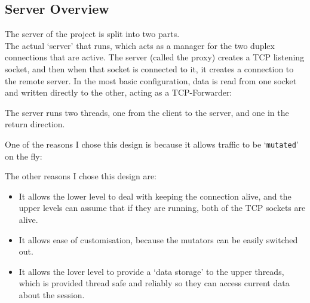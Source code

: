 \subsection{Server Overview}
The server of the project is split into two parts.\\
The actual `server' that runs, which acts as a manager for the two duplex connections that are active. The server (called the proxy) creates a TCP listening socket, and then when that socket is connected to it, it creates a connection to the remote server.
In the most basic configuration, data is read from one socket and written directly to the other, acting as a TCP-Forwarder:
\begin{center}
\end{center}

The server runs two threads, one from the client to the server, and one in the return direction.\par
One of the reasons I chose this design is because it allows traffic to be `\texttt{mutated}' on the fly:
\begin{center}
\end{center}
The other reasons I chose this design are:
\begin{itemize}
    \item It allows the lower level to deal with keeping the connection alive, and the upper levels can assume that if they are running, both of the TCP sockets are alive.
    \item It allows ease of customisation, because the mutators can be easily switched out.
    \item It allows the lover level to provide a `data storage' to the upper threads, which is provided thread safe and reliably so they can access current data about the session.
\end{itemize}

